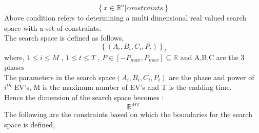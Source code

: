 \documentclass{article}
\begin{document}
 \[ \left\{ {x \in \mathbb{R}^n | constraints } \right\} \] 
Above condition refers to determining a multi dimensional real valued search space with a set of constraints.\\[0.2cm]
The search space is defined as follows,
\[ \left\{ ( A_i, B_i, C_i, P_i ) \right\}_t \] 
where,
 \(1  \leq i \leq M  \) , \(1  \leq t \leq T  \) , \( P \in 
 \left[-P_{max}, P_{max} \right] \subseteq \mathbb{R}\) and A,B,C are the 3 phases\\[0.3cm]
 The parameters in the search space\( \left( A_i, B_i, C_i , P_i \right)\) are the phase and power of \(i^{th}\) EV's, M is the maximum number of EV's and T is the endding time.\\[0.3cm]
 Hence the dimension of the search space becomes : \[ \mathbb{R}^{MT} \] 
 The following are the constraints based on which the boundaries for the search space is defined,
\end{document}
